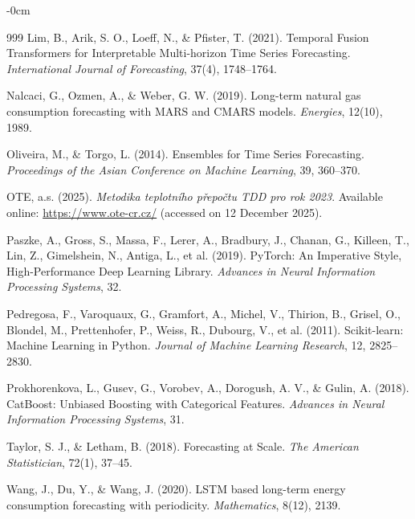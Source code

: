 \documentclass[journal,article,submit,pdftex,moreauthors]{Definitions/mdpi}
\begin{document}
\begin{adjustwidth}{-\extralength}{0cm}
{\begin{thebibliography}{999}
Lim, B., Arik, S. O., Loeff, N., \& Pfister, T. (2021). Temporal Fusion Transformers for Interpretable Multi-horizon Time Series Forecasting. \textit{International Journal of Forecasting}, 37(4), 1748--1764.

Nalcaci, G., Ozmen, A., \& Weber, G. W. (2019). Long-term natural gas consumption forecasting with MARS and CMARS models. \textit{Energies}, 12(10), 1989.

Oliveira, M., \& Torgo, L. (2014). Ensembles for Time Series Forecasting. \textit{Proceedings of the Asian Conference on Machine Learning}, 39, 360--370.

OTE, a.s. (2025). \textit{Metodika teplotního přepočtu TDD pro rok 2023}. Available online: \url{https://www.ote-cr.cz/} (accessed on 12 December 2025).

Paszke, A., Gross, S., Massa, F., Lerer, A., Bradbury, J., Chanan, G., Killeen, T., Lin, Z., Gimelshein, N., Antiga, L., et al. (2019). PyTorch: An Imperative Style, High-Performance Deep Learning Library. \textit{Advances in Neural Information Processing Systems}, 32.

Pedregosa, F., Varoquaux, G., Gramfort, A., Michel, V., Thirion, B., Grisel, O., Blondel, M., Prettenhofer, P., Weiss, R., Dubourg, V., et al. (2011). Scikit-learn: Machine Learning in Python. \textit{Journal of Machine Learning Research}, 12, 2825--2830.

Prokhorenkova, L., Gusev, G., Vorobev, A., Dorogush, A. V., \& Gulin, A. (2018). CatBoost: Unbiased Boosting with Categorical Features. \textit{Advances in Neural Information Processing Systems}, 31.

Taylor, S. J., \& Letham, B. (2018). Forecasting at Scale. \textit{The American Statistician}, 72(1), 37--45.

Wang, J., Du, Y., \& Wang, J. (2020). LSTM based long-term energy consumption forecasting with periodicity. \textit{Mathematics}, 8(12), 2139.


\end{thebibliography}}
\end{adjustwidth}
\end{document}
